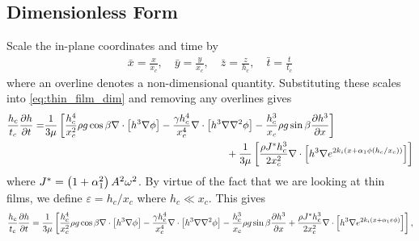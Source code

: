 \subsection{Dimensionless Form}
Scale the in-plane coordinates and time by 
\begin{gather*}
    \bar{x} = \frac{x}{x_c}, \quad \bar{y} = \frac{y}{x_c}, \quad \bar{z} = \frac{z}{h_c}, \quad \bar{t} = \frac{t}{t_c}
\end{gather*}
where an overline denotes a non-dimensional quantity. Substituting these scales 
into \cref{eq:thin_film_dim} and removing any overlines gives 
\begin{align}
    \begin{split}
        \frac{h_c}{t_c} \frac{\partial h}{\partial t} = &\frac{1}{3\mu} \left[ 
            \frac{h_c^4}{x_c^2} \rho g \cos \beta \nabla \cdot \left[ h^3\nabla\phi \right] - 
            \frac{\gamma h_c^4}{x_c^4} \nabla \cdot \left[ h^3 \nabla \nabla^2 \phi \right] - 
            \frac{h_c^3}{x_c} \rho g \sin\beta \frac{\partial h^3}{\partial x}
         \right]\\
        &\qquad \qquad \qquad \qquad \qquad \qquad \qquad \qquad \qquad + \frac{1}{3\mu} \left[  
            \frac{\rho J^* h_c^3}{2 x_c^2} \nabla \cdot \left[ h^3 \nabla e^{2k_i \left( x + \alpha_1 \phi \left( h_c/x_c \right) \right)} \right]
         \right]
    \end{split}
    \label{eq:nondim_first}
\end{align}
where $J^* = \left( 1+\alpha_1^2 \right)A^2\omega^2$. 
By virtue of the fact that we are looking at thin films, we define $\varepsilon = h_c / x_c$ where $h_c \ll x_c$. 
This gives
\begin{gather*}
    \nonumber \frac{h_c}{t_c} \frac{\partial h}{\partial t} = \frac{1}{3\mu} \left[ 
        \frac{h_c^4}{x_c^2} \rho g \cos \beta \nabla \cdot \left[ h^3\nabla\phi \right] - 
        \frac{\gamma h_c^4}{x_c^4} \nabla \cdot \left[ h^3 \nabla \nabla^2 \phi \right] - 
        \frac{h_c^3}{x_c} \rho g \sin\beta \frac{\partial h^3}{\partial x} + 
        \frac{\rho J^* h_c^3}{2 x_c^2} \nabla \cdot \left[ h^3 \nabla e^{2k_i \left( x + \alpha_1 \varepsilon \phi \right)} \right]
     \right],
\end{gather*}
